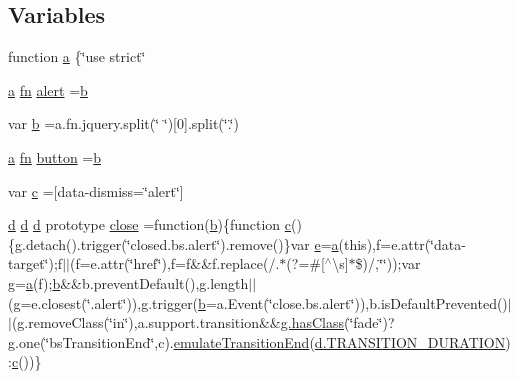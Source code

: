 \subsection*{Variables}
\begin{DoxyCompactItemize}
\item 
function \hyperlink{a00029_ae8f6b400ed3390908c5cdeebed3a82b9}{a} \{\char`\"{}use strict\char`\"{}
\item 
\hyperlink{a00029_a1f5870dcf487187f13d5fd328ed9e6e7}{a} \hyperlink{a00030_ab2836ee14921cbd6e34ea91a9a99ad66}{fn} \hyperlink{a00029_aaa41eef066735d697e7786ec86d52389}{alert} =\hyperlink{a00029_a398bb8542498d1b14178b02b99df309b}{b}
\item 
var \hyperlink{a00029_ac0431efac4d7c393d1e70b86115cb93f}{b} =a.\+fn.\+jquery.\+split(\char`\"{} \char`\"{})\mbox{[}0\mbox{]}.split(\char`\"{}.\char`\"{})
\item 
\hyperlink{a00029_a1f5870dcf487187f13d5fd328ed9e6e7}{a} \hyperlink{a00030_ab2836ee14921cbd6e34ea91a9a99ad66}{fn} \hyperlink{a00029_a55e170814e74f6c3db8ae9ea3ba9054f}{button} =\hyperlink{a00029_a398bb8542498d1b14178b02b99df309b}{b}
\item 
var \hyperlink{a00029_ad9d1ac02e33c4aed62ad517a7cb8b3fb}{c} =\textquotesingle{}\mbox{[}data-\/dismiss=\char`\"{}alert\char`\"{}\mbox{]}\textquotesingle{}
\item 
\hyperlink{a00029_aeb337d295abaddb5ec3cb34cc2e2bbc9}{d} \hyperlink{a00029_aeb337d295abaddb5ec3cb34cc2e2bbc9}{d} \hyperlink{a00029_aeb337d295abaddb5ec3cb34cc2e2bbc9}{d} prototype \hyperlink{a00029_a72fbb3628c3cc943ced8aad64247888c}{close} =function(\hyperlink{a00029_a398bb8542498d1b14178b02b99df309b}{b})\{function \hyperlink{a00029_ad9d1ac02e33c4aed62ad517a7cb8b3fb}{c}()\{g.\+detach().trigger(\char`\"{}closed.\+bs.\+alert\char`\"{}).remove()\}var \hyperlink{a00029_ab5902775854a8b8440bcd25e0fe1c120}{e}=\hyperlink{a00029_a1f5870dcf487187f13d5fd328ed9e6e7}{a}(this),f=e.\+attr(\char`\"{}data-\/target\char`\"{});f$\vert$$\vert$(f=e.\+attr(\char`\"{}href\char`\"{}),f=f\&\&f.\+replace(/.$\ast$(?=\#\mbox{[}$^\wedge$\textbackslash{}s\mbox{]}$\ast$\$)/,\char`\"{}\char`\"{}));var g=\hyperlink{a00029_a1f5870dcf487187f13d5fd328ed9e6e7}{a}(f);\hyperlink{a00029_a398bb8542498d1b14178b02b99df309b}{b}\&\&b.\+prevent\+Default(),g.\+length$\vert$$\vert$(g=e.\+closest(\char`\"{}.alert\char`\"{})),g.\+trigger(\hyperlink{a00029_a398bb8542498d1b14178b02b99df309b}{b}=a.\+Event(\char`\"{}close.\+bs.\+alert\char`\"{})),b.\+is\+Default\+Prevented()$\vert$$\vert$(g.\+remove\+Class(\char`\"{}in\char`\"{}),a.\+support.\+transition\&\&\hyperlink{a00029_afa9eb56c756985e9715e3820fd044aa3}{g.\+has\+Class}(\char`\"{}fade\char`\"{})?g.\+one(\char`\"{}bs\+Transition\+End\char`\"{},c).\hyperlink{a00029_a006fe6a2a254572b367123c6db401ff3}{emulate\+Transition\+End}(\hyperlink{a00029_ae4adb159aeacba734c34bd530baf92f6}{d.\+T\+R\+A\+N\+S\+I\+T\+I\+O\+N\+\_\+\+D\+U\+R\+A\+T\+I\+O\+N})\+:\hyperlink{a00029_ad9d1ac02e33c4aed62ad517a7cb8b3fb}{c}())\}
$$
\end{DoxyCompactItemize}
